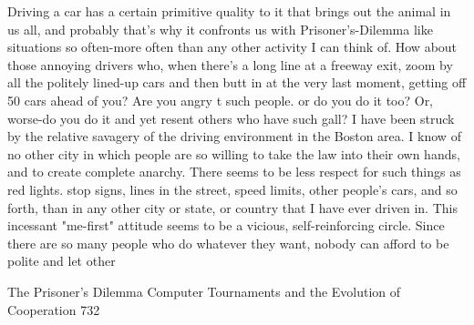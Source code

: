         Driving a car has a certain primitive quality to it that brings out the animal in us
all, and probably that's why it confronts us with Prisoner's-Dilemma like situations so
often-more often than any other activity I can think of. How about those annoying drivers
who, when there's a long line at a freeway exit, zoom by all the politely lined-up cars and
then butt in at the very last moment, getting off 50 cars ahead of you? Are you angry t
such people. or do you do it too? Or, worse-do you do it and yet resent others who have
such gall?
        I have been struck by the relative savagery of the driving environment in the
Boston area. I know of no other city in which people are so willing to take the law into
their own hands, and to create complete anarchy. There seems to be less respect for such
things as red lights. stop signs, lines in the street, speed limits, other people's cars, and so
forth, than in any other city or state, or country that I have ever driven in. This incessant
"me-first" attitude seems to be a vicious, self-reinforcing circle. Since there are so many
people who do whatever they want, nobody can afford to be polite and let other




The Prisoner's Dilemma Computer Tournaments and the Evolution of Cooperation               732

